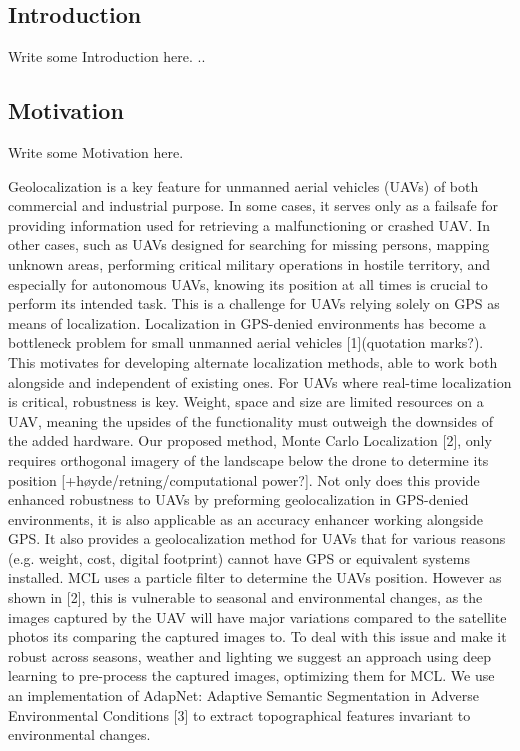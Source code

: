 \begin{introduction}
\section{Introduction}     %
Write some Introduction here.
..
\subsection{Motivation}
Write some Motivation here.

Geolocalization is a key feature for unmanned aerial vehicles (UAVs) of both commercial and industrial purpose. In some cases, it serves only as a failsafe for providing information used for retrieving a malfunctioning or crashed UAV. In other cases, such as UAVs designed for searching for missing persons, mapping unknown areas, performing critical military operations in hostile territory, and especially for autonomous UAVs, knowing its position at all times is crucial to perform its intended task. This is a challenge for UAVs relying solely on GPS as means of localization. Localization in GPS-denied environments has become a bottleneck problem for small unmanned aerial vehicles [1](quotation marks?). This motivates for developing alternate localization methods, able to work both alongside and independent of existing ones. For UAVs where real-time localization is critical, robustness is key. Weight, space and size are limited resources on a UAV, meaning the upsides of the functionality must outweigh the downsides of the added hardware. Our proposed method, Monte Carlo Localization [2], only requires orthogonal imagery of the landscape below the drone to determine its position [+høyde/retning/computational power?]. Not only does this provide enhanced robustness to UAVs by preforming geolocalization in GPS-denied environments, it is also applicable as an accuracy enhancer working alongside GPS. It also provides a geolocalization method for UAVs that for various reasons (e.g. weight, cost, digital footprint) cannot have GPS or equivalent systems installed. MCL uses a particle filter to determine the UAVs position. However as shown in [2], this is vulnerable to seasonal and environmental changes, as the images captured by the UAV will have major variations compared to the satellite photos its comparing the captured images to. To deal with this issue and make it robust across seasons, weather and lighting we suggest an approach using deep learning to pre-process the captured images, optimizing them for MCL. We use an implementation of AdapNet: Adaptive Semantic Segmentation in Adverse Environmental Conditions [3] to extract topographical features invariant to environmental changes.


\end{introduction}
